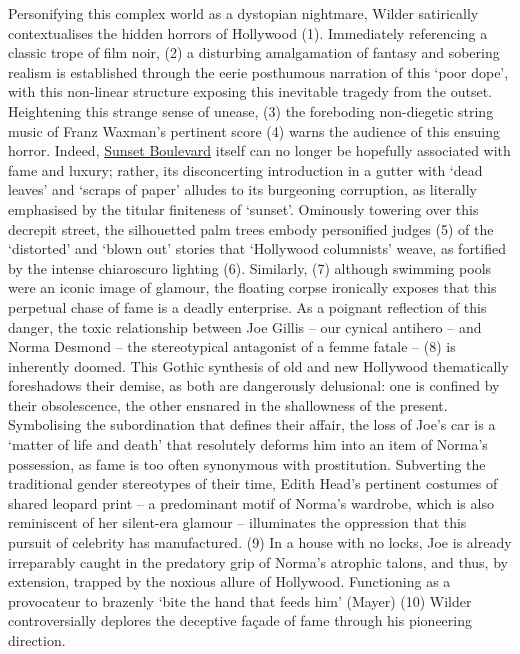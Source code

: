 \documentclass[a4paper]{article}
\begin{document}
Personifying this complex world as a dystopian nightmare, Wilder satirically contextualises the hidden horrors of Hollywood (1). Immediately referencing a classic trope of film noir, (2) a disturbing amalgamation of fantasy and sobering realism is established through the eerie posthumous narration of this ‘poor dope’, with this non-linear structure exposing this inevitable tragedy from the outset. Heightening this strange sense of unease, (3) the foreboding non-diegetic string music of Franz Waxman’s pertinent score (4) warns the audience of this ensuing horror. Indeed, \underline{Sunset Boulevard} itself can no longer be hopefully associated with fame and luxury; rather, its disconcerting introduction in a gutter with ‘dead leaves’ and ‘scraps of paper’ alludes to its burgeoning corruption, as literally emphasised by the titular finiteness of ‘sunset’. Ominously towering over this decrepit street, the silhouetted palm trees embody personified judges (5) of the ‘distorted’ and ‘blown out’ stories that ‘Hollywood columnists’ weave, as fortified by the intense chiaroscuro lighting (6). Similarly, (7) although swimming pools were an iconic image of glamour, the floating corpse ironically exposes that this perpetual chase of fame is a deadly enterprise. As a poignant reflection of this danger, the toxic relationship between Joe Gillis – our cynical antihero – and Norma Desmond – the stereotypical antagonist of a femme fatale – (8) is inherently doomed. This Gothic synthesis of old and new Hollywood thematically foreshadows their demise, as both are dangerously delusional: one is confined by their obsolescence, the other ensnared in the shallowness of the present. Symbolising the subordination that defines their affair, the loss of Joe’s car is a ‘matter of life and death’ that resolutely deforms him into an item of Norma’s possession, as fame is too often synonymous with prostitution. Subverting the traditional gender stereotypes of their time, Edith Head’s pertinent costumes of shared leopard print – a predominant motif of Norma’s wardrobe, which is also reminiscent of her silent-era glamour – illuminates the oppression that this pursuit of celebrity has manufactured. (9) In a house with no locks, Joe is already irreparably caught in the predatory grip of Norma’s atrophic talons, and thus, by extension, trapped by the noxious allure of Hollywood. Functioning as a provocateur to brazenly ‘bite the hand that feeds him’ (Mayer) (10) Wilder controversially deplores the deceptive façade of fame through his pioneering direction.\\
\end{document}
